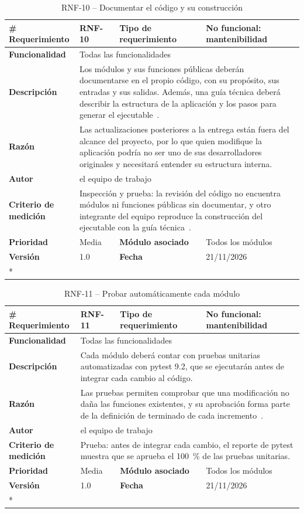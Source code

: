 \begin{longtable}{|p{\rqA}|p{\rqB}|p{\rqC}|p{\rqD}|}
  \caption{RNF-10 -- Documentar el código y su construcción}\label{tab:rnf-10}\tabularnewline
  \hline
  \textbf{\# Requerimiento} & RNF-10 & \raggedright\textbf{Tipo de requerimiento} & No funcional: mantenibilidad\tabularnewline\hline
  \raggedright\textbf{Funcionalidad} & \multicolumn{3}{p{\rqBCD}|}{Todas las funcionalidades}\tabularnewline\hline
  \endfirsthead
  \textbf{Descripción} & \multicolumn{3}{p{\rqBCD}|}{Los módulos y sus funciones públicas deberán documentarse en el propio código, con su propósito, sus entradas y sus salidas. Además, una guía técnica deberá describir la estructura de la aplicación y los pasos para generar el ejecutable~\cite{pmp2026}.}\tabularnewline\hline
  \textbf{Razón} & \multicolumn{3}{p{\rqBCD}|}{Las actualizaciones posteriores a la entrega están fuera del alcance del proyecto, por lo que quien modifique la aplicación podría no ser uno de sus desarrolladores originales y necesitará entender su estructura interna.}\tabularnewline\hline
  \textbf{Autor} & \multicolumn{3}{p{\rqBCD}|}{el equipo de trabajo}\tabularnewline\hline
  \raggedright\textbf{Criterio de medición} & \multicolumn{3}{p{\rqBCD}|}{Inspección y prueba: la revisión del código no encuentra módulos ni funciones públicas sin documentar, y otro integrante del equipo reproduce la construcción del ejecutable con la guía técnica~\cite{pmp2026}.}\tabularnewline\hline
  \textbf{Prioridad} & Media & \raggedright\textbf{Módulo asociado} & Todos los módulos\tabularnewline\hline
  \textbf{Versión} & 1.0 & \textbf{Fecha} & 21/11/2026\tabularnewline*\cline{1-4}
\end{longtable}

\begin{longtable}{|p{\rqA}|p{\rqB}|p{\rqC}|p{\rqD}|}
  \caption{RNF-11 -- Probar automáticamente cada módulo}\label{tab:rnf-11}\tabularnewline
  \hline
  \textbf{\# Requerimiento} & RNF-11 & \raggedright\textbf{Tipo de requerimiento} & No funcional: mantenibilidad\tabularnewline\hline
  \raggedright\textbf{Funcionalidad} & \multicolumn{3}{p{\rqBCD}|}{Todas las funcionalidades}\tabularnewline\hline
  \endfirsthead
  \textbf{Descripción} & \multicolumn{3}{p{\rqBCD}|}{Cada módulo deberá contar con pruebas unitarias automatizadas con pytest 9.2, que se ejecutarán antes de integrar cada cambio al código.}\tabularnewline\hline
  \textbf{Razón} & \multicolumn{3}{p{\rqBCD}|}{Las pruebas permiten comprobar que una modificación no daña las funciones existentes, y su aprobación forma parte de la definición de terminado de cada incremento~\cite{pmp2026}.}\tabularnewline\hline
  \textbf{Autor} & \multicolumn{3}{p{\rqBCD}|}{el equipo de trabajo}\tabularnewline\hline
  \raggedright\textbf{Criterio de medición} & \multicolumn{3}{p{\rqBCD}|}{Prueba: antes de integrar cada cambio, el reporte de pytest muestra que se aprueba el 100~\% de las pruebas unitarias.}\tabularnewline\hline
  \textbf{Prioridad} & Media & \raggedright\textbf{Módulo asociado} & Todos los módulos\tabularnewline\hline
  \textbf{Versión} & 1.0 & \textbf{Fecha} & 21/11/2026\tabularnewline*\cline{1-4}
\end{longtable}
